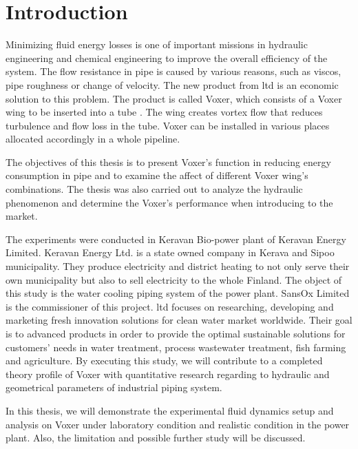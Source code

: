 
\chapter{Introduction}

Minimizing fluid energy losses is one of important missions in hydraulic engineering and chemical engineering to improve the overall efficiency of the system. The flow resistance in pipe is caused by various reasons, such as \gls{viscos}, pipe roughness or change of velocity.\newline
The new product from \gls{ltd} is an economic solution to this problem. The product is called Voxer, which consists of a Voxer wing to be inserted into a tube . The wing creates vortex flow that reduces turbulence and flow loss in the tube. Voxer can be installed in various places allocated accordingly in a whole pipeline. 

The objectives of this thesis is to present Voxer's function in reducing energy consumption in pipe and to examine the affect of different Voxer wing's combinations. The thesis was also carried out to analyze the hydraulic phenomenon and determine the Voxer's performance when introducing to the market.

The experiments were conducted in Keravan Bio-power plant of Keravan Energy Limited. Keravan Energy Ltd. is a state owned company in Kerava and Sipoo municipality. They produce electricity and district heating to not only serve their own municipality but also to sell electricity to the whole Finland. The object of this study is the water cooling piping system of the power plant.\newline
SansOx Limited is the commissioner of this project. \gls{ltd} focuses on researching, developing and marketing fresh innovation solutions for clean water market worldwide. Their goal is to advanced products in order to provide the optimal sustainable solutions for customers' needs in water treatment, process wastewater treatment, fish farming and agriculture. By executing this study, we will contribute to a completed theory profile of Voxer with quantitative research regarding to hydraulic and geometrical parameters of industrial piping system. 

In this thesis, we will demonstrate the experimental fluid dynamics setup and analysis on Voxer under laboratory condition and realistic condition in the power plant. Also, the limitation and possible further study will be discussed. 

\clearpage %
